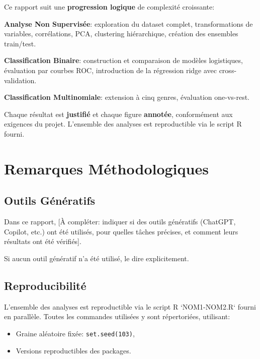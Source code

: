 \documentclass[11pt,a4paper,french]{report}
\begin{document}
Ce rapport suit une \textbf{progression logique} de complexité croissante:

\begin{description}[labelwidth=3cm]
    \item[Partie I] \textbf{Analyse Non Supervisée}: exploration du dataset complet, transformations de variables, corrélations, PCA, clustering hiérarchique, création des ensembles train/test.
    \item[Partie II] \textbf{Classification Binaire}: construction et comparaison de modèles logistiques, évaluation par courbes ROC, introduction de la régression ridge avec cross-validation.
    \item[Partie III] \textbf{Classification Multinomiale}: extension à cinq genres, évaluation one-vs-rest.
\end{description}

Chaque résultat est \textbf{justifié} et chaque figure \textbf{annotée}, conformément aux exigences du projet. L'ensemble des analyses est reproductible via le script R fourni.

\section*{Remarques Méthodologiques}

\subsection*{Outils Génératifs}

Dans ce rapport, [À compléter: indiquer si des outils génératifs (ChatGPT, Copilot, etc.) ont été utilisés, pour quelles tâches précises, et comment leurs résultats ont été vérifiés].

Si aucun outil génératif n'a été utilisé, le dire explicitement.

\subsection*{Reproducibilité}

L'ensemble des analyses est reproductible via le script R `NOM1-NOM2.R` fourni en parallèle. Toutes les commandes utilisées y sont répertoriées, utilisant:
\begin{itemize}
    \item Graine aléatoire fixée: \texttt{set.seed(103)},
    \item Versions reproductibles des packages.
\end{itemize}
\end{document}
